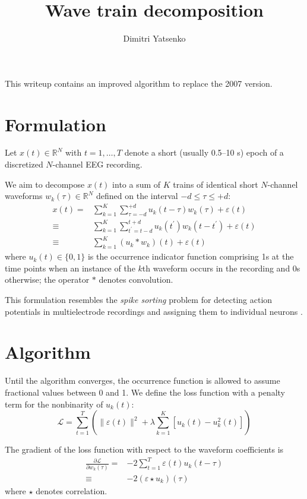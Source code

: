\documentclass[10pt,twocolumn]{article}
\title{Wave train decomposition}
\author{Dimitri Yatsenko}
\newcommand{\R}{\mathbb R}
\begin{document}
\maketitle
This writeup contains an improved algorithm to replace the 2007 version. 

\section*{Formulation}
Let $x(t)\in \R^N$ with $t = 1,\ldots,T$ denote a short (usually 0.5--10 s) epoch of a discretized $N$-channel EEG recording.

We aim to decompose $x(t)$ into a sum of $K$ trains of identical short $N$-channel waveforms $w_k(\tau)\in \R^N$ defined on the interval $-d \le \tau \le +d$:
\begin{equation}
\begin{split}
x(t) = & 
\sum\limits_{k=1}^K \sum_{\tau=-d}^{+d} u_k(t-\tau)w_k(\tau) + \varepsilon(t)
\\
\equiv &
\sum\limits_{k=1}^K \sum_{t^\prime=t-d}^{t+d} u_k(t^\prime)w_k(t-t^\prime) + \varepsilon(t)
\\
\equiv &
\sum\limits_{k=1}^K (u_k*w_k)(t) + \varepsilon(t)
\end{split}
\end{equation}
where $u_k(t)\in \{0,1\}$ is the occurrence indicator function comprising 1s at the time points when an instance of the $k$th waveform occurs in the recording and 0s otherwise; the operator $*$ denotes convolution.

This formulation resembles the \emph{spike sorting} problem for detecting action potentials in multielectrode recordings and assigning them to individual neurons \cite{pillow_model-based_2013}.

\section*{Algorithm}
Until the algorithm converges, the occurrence function is allowed to assume fractional values between 0 and 1.
We define the loss function with a penalty term for the nonbinarity of $u_k(t)$:
\begin{equation}
\mathcal L = 
\sum\limits_{t=1}^T\left(\|\varepsilon(t)\|^2 
+ \lambda \sum\limits_{k=1}^K \left[u_k(t)-u_k^2(t)\right]\right) 
\end{equation}

The gradient of the loss function with respect to the waveform coefficients is 
\begin{equation}
\begin{split}
\frac{\partial \mathcal L}{\partial w_k(\tau)} 
= & -2\sum\limits_{t=1}^T \varepsilon(t) u_k(t-\tau)
\\
\equiv & -2 (\varepsilon\star u_k)(\tau)
\end{split}
\end{equation}
where $\star$ denotes correlation.
\end{document}
